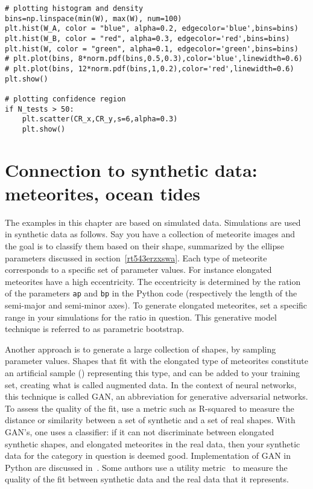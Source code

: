 \documentclass[oneside,10pt]{book}
\begin{document}
\begin{lstlisting}[escapechar=@]
# plotting histogram and density
bins=np.linspace(min(W), max(W), num=100)
plt.hist(W_A, color = "blue", alpha=0.2, edgecolor='blue',bins=bins)
plt.hist(W_B, color = "red", alpha=0.3, edgecolor='red',bins=bins)
plt.hist(W, color = "green", alpha=0.1, edgecolor='green',bins=bins)
# plt.plot(bins, 8*norm.pdf(bins,0.5,0.3),color='blue',linewidth=0.6)
# plt.plot(bins, 12*norm.pdf(bins,1,0.2),color='red',linewidth=0.6)
plt.show()

# plotting confidence region
if N_tests > 50:
    plt.scatter(CR_x,CR_y,s=6,alpha=0.3)
    plt.show()
\end{lstlisting}

\section{Connection to synthetic data: meteorites, ocean tides}\label{psoriasisy}

The examples in this chapter are based on simulated data. Simulations are used in synthetic data as follows. Say you have a collection of meteorite images and the goal is to classify them based on their shape, summarized by the ellipse parameters discussed in section~\ref{rt543erzxswa}.
Each type of meteorite corresponds to a specific set of parameter values. For instance elongated meteorites have a high eccentricity. The eccentricity is determined by the ration of the parameters \texttt{ap} and \texttt{bp} in the Python code (respectively the length of the semi-major and semi-minor axes). To generate elongated meteorites, set a specific range in your simulations for the ratio in question. This \textcolor{index}{generative model} technique is referred to as \textcolor{index}{parametric bootstrap}.

Another approach is to generate a large collection of shapes, by sampling parameter values. Shapes that fit with the elongated type of meteorites constitute an artificial sample () representing this type, and can be added to your training set, creating what is called
 \textcolor{index}{augmented data}. In the context of neural networks, this technique is called \textcolor{index}{GAN}, an abbreviation for
\textcolor{index}{generative adversarial networks}. To assess the quality of the fit, use a metric such as \textcolor{index}{R-squared} to measure the distance or similarity between a set of synthetic and a set of real shapes. With GAN's, one uses a classifier: if it can not discriminate between elongated synthetic shapes, and elongated meteorites in the real data, then your synthetic data for the category in question is deemed good.  Implementation of GAN in Python are discussed in~\cite{ganclouc}. Some authors use a
utility metric~\cite{utiljrss} to measure the quality of the fit between synthetic data and the real data that it represents.
\end{document}
